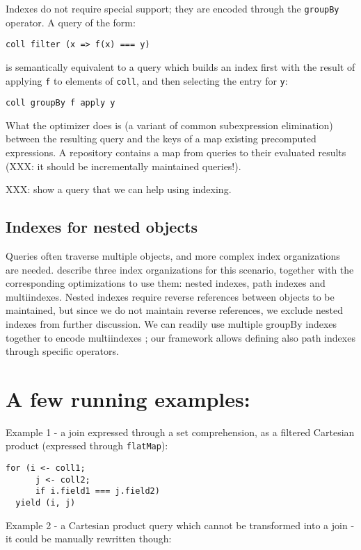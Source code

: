 \documentclass[preprint,authoryear,10pt]{sigplanconf}
\begin{document}
Indexes do not require special support; they are encoded through the
\texttt{groupBy} operator. A query of the form:

\begin{lstlisting}
coll filter (x => f(x) === y)
\end{lstlisting}
is semantically equivalent to a query which builds an index first with
the result of applying \texttt{f} to elements of \texttt{coll}, and then
selecting the entry for \texttt{y}:

\begin{lstlisting}
coll groupBy f apply y
\end{lstlisting}
What the optimizer does is (a variant of common subexpression
elimination) between the resulting query and the keys of a map existing
precomputed expressions. A repository contains a map from queries to
their evaluated results (XXX: it should be incrementally maintained
queries!).

XXX: show a query that we can help using indexing.

\subsection{Indexes for nested objects}

Queries often traverse multiple objects, and more complex index
organizations are needed. \citet{Bertino89} describe three index
organizations for this scenario, together with the corresponding
optimizations to use them: nested indexes, path indexes and
multiindexes. Nested indexes require reverse references between objects
to be maintained, but since we do not maintain reverse references, we
exclude nested indexes from further discussion. We can readily use
multiple groupBy indexes together to encode multiindexes
\citep{Bertino89}; our framework allows defining also path indexes
through specific operators.

\section{A few running examples:}

Example 1 - a join expressed through a set comprehension, as a filtered
Cartesian product (expressed through \texttt{flatMap}):

\begin{lstlisting}
for (i <- coll1;
      j <- coll2;
      if i.field1 === j.field2)
  yield (i, j)
\end{lstlisting}
Example 2 - a Cartesian product query which cannot be transformed into a
join - it could be manually rewritten though:
\end{document}
